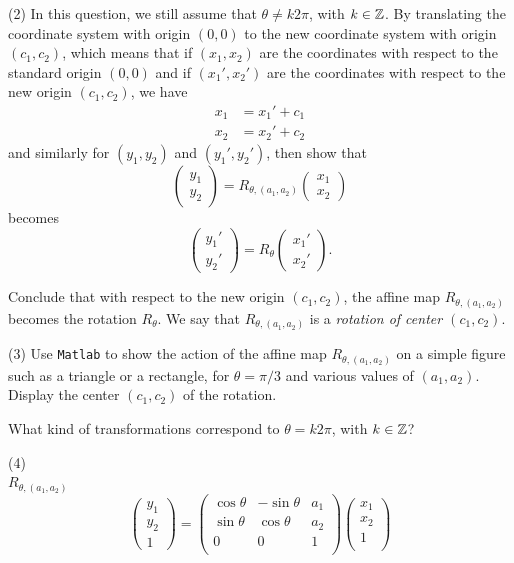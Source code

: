 \documentclass[12pt]{article}
\begin{document}
\medskip
(2)
In this question, we still assume that
 $\theta\not= k 2\pi$, with $k \in \mathbb{Z}$.
By translating the coordinate system with origin $(0, 0)$
to the new coordinate system with origin $(c_1, c_2)$, which
means that if $(x_1, x_2)$ are the coordinates with respect to the 
standard origin $(0, 0)$ and if $(x_1', x_2')$ are the coordinates with respect 
to the new origin $(c_1, c_2)$,  we have
\begin{align*}
x_1 & = x_1' + c_1 \\
x_2 & = x_2' + c_2
\end{align*}
and similarly for $(y_1, y_2)$ and $(y_1', y_2')$,
then show that 
\[
\begin{pmatrix}
y_1 \\
y_2
\end{pmatrix} 
=
R_{\theta, (a_1,a_2)}
\begin{pmatrix}
x_1 \\
x_2
\end{pmatrix}
\]
becomes
\[
\begin{pmatrix}
y_1' \\
y_2'
\end{pmatrix} 
=
R_{\theta}
\begin{pmatrix}
x_1' \\
x_2'
\end{pmatrix}.
\]

\medskip
Conclude that with respect to the new origin $(c_1, c_2)$, 
the affine map $R_{\theta, (a_1,a_2)}$ becomes the 
rotation $R_{\theta}$. We say that $R_{\theta, (a_1,a_2)}$ 
is a {\it rotation of center $(c_1, c_2)$\/}.

\medskip
(3)
Use {\tt Matlab} to show the action of  the affine map
$R_{\theta, (a_1,a_2)}$ on a simple figure such as
a triangle or a rectangle,
for $\theta = \pi/3$ and various values of $(a_1, a_2)$.
Display the center $(c_1, c_2)$ of the rotation.

\medskip
What kind of transformations correspond to
$\theta= k 2\pi$, with $k \in \mathbb{Z}$?


\medskip
(4) \\

$R_{\theta, (a_1,a_2)}$ \\
\[
\begin{pmatrix}
y_1 \\
y_2 \\
1
\end{pmatrix}
=
\begin{pmatrix}
\cos\theta & -\sin\theta & a_1 \\
\sin\theta & \cos\theta & a_2 \\
0 & 0 & 1 \\
\end{pmatrix}
\begin{pmatrix}
x_1 \\
x_2 \\
1 \\
\end{pmatrix}
\]
\end{document}
